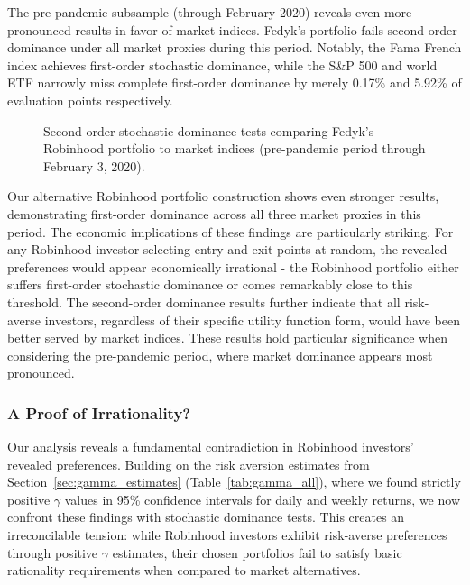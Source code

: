 The pre-pandemic subsample (through February 2020) reveals even more pronounced results in favor of market indices. 
Fedyk's portfolio fails second-order dominance under all market proxies during this period. 
Notably, the Fama French index achieves first-order stochastic dominance, while the S\&P 500 and world ETF narrowly miss complete first-order dominance by merely 0.17\% and 5.92\% of evaluation points respectively. 

\begin{figure}[H]
    \centering
    \hfill
    \caption{Second-order stochastic dominance tests comparing Fedyk's Robinhood portfolio to market indices (pre-pandemic period through February 3, 2020).}
    \label{fig:cutoff_all_sidebyside}
\end{figure}

Our alternative Robinhood portfolio construction shows even stronger results, demonstrating first-order dominance across all three market proxies in this period.
The economic implications of these findings are particularly striking. 
For any Robinhood investor selecting entry and exit points at random, the revealed preferences would appear economically irrational - the Robinhood portfolio either suffers first-order stochastic dominance or comes remarkably close to this threshold. 
The second-order dominance results further indicate that all risk-averse investors, regardless of their specific utility function form, would have been better served by market indices. 
These results hold particular significance when considering the pre-pandemic period, where market dominance appears most pronounced.

\subsubsection{A Proof of Irrationality?}
Our analysis reveals a fundamental contradiction in Robinhood investors' revealed preferences. 
Building on the risk aversion estimates from Section~\ref{sec:gamma_estimates} (Table~\ref{tab:gamma_all}), where we found strictly positive \(\gamma\) values in 95\% confidence intervals for daily and weekly returns, we now confront these findings with stochastic dominance tests. 
This creates an irreconcilable tension: while Robinhood investors exhibit risk-averse preferences through positive \(\gamma\) estimates, their chosen portfolios fail to satisfy basic rationality requirements when compared to market alternatives.

